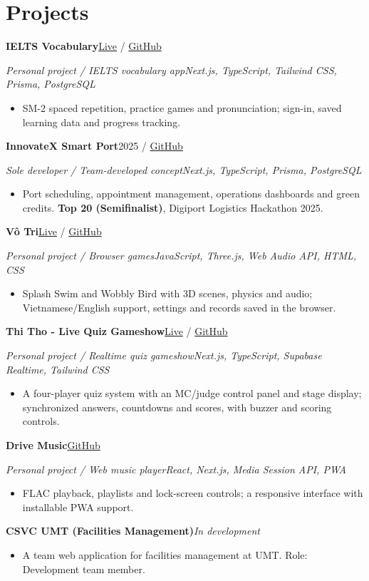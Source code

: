 \documentclass[10pt,a4paper]{article}
\newcommand{\project}[2]{\textbf{#1}\hfill #2\par}
\newcommand{\projectmeta}[2]{{\fontsize{9}{11}\selectfont\itshape #1\hfill #2}\par}
\begin{document}
\section{Projects}
\project{IELTS Vocabulary}{\href{https://ielts.ungnhutkhang.id.vn/}{Live} / \href{https://github.com/mm4you/ielts}{GitHub}}
\projectmeta{Personal project / IELTS vocabulary app}{Next.js, TypeScript, Tailwind CSS, Prisma, PostgreSQL}
\begin{itemize}
\item SM-2 spaced repetition, practice games and pronunciation; sign-in, saved learning data and progress tracking.
\end{itemize}
\vspace{2pt}
\project{InnovateX Smart Port}{2025 / \href{https://github.com/mm4you/hackathon}{GitHub}}
\projectmeta{Sole developer / Team-developed concept}{Next.js, TypeScript, Prisma, PostgreSQL}
\begin{itemize}
\item Port scheduling, appointment management, operations dashboards and green credits. \textbf{Top 20 (Semifinalist)}, Digiport Logistics Hackathon 2025.
\end{itemize}
\vspace{2pt}
\project{Vô Tri}{\href{https://votrihub.vercel.app/}{Live} / \href{https://github.com/mm4you/votri}{GitHub}}
\projectmeta{Personal project / Browser games}{JavaScript, Three.js, Web Audio API, HTML, CSS}
\begin{itemize}
\item Splash Swim and Wobbly Bird with 3D scenes, physics and audio; Vietnamese/English support, settings and records saved in the browser.
\end{itemize}
\vspace{2pt}
\project{Thi Tho - Live Quiz Gameshow}{\href{https://thitho.vercel.app/}{Live} / \href{https://github.com/mm4you/thitho}{GitHub}}
\projectmeta{Personal project / Realtime quiz gameshow}{Next.js, TypeScript, Supabase Realtime, Tailwind CSS}
\begin{itemize}
\item A four-player quiz system with an MC/judge control panel and stage display; synchronized answers, countdowns and scores, with buzzer and scoring controls.
\end{itemize}
\vspace{2pt}
\project{Drive Music}{\href{https://github.com/mm4you/drive-music}{GitHub}}
\projectmeta{Personal project / Web music player}{React, Next.js, Media Session API, PWA}
\begin{itemize}
\item FLAC playback, playlists and lock-screen controls; a responsive interface with installable PWA support.
\end{itemize}
\vspace{2pt}
\project{CSVC UMT (Facilities Management)}{\textit{In development}}
\begin{itemize}
\item A team web application for facilities management at UMT. Role: Development team member.
\end{itemize}
\end{document}
